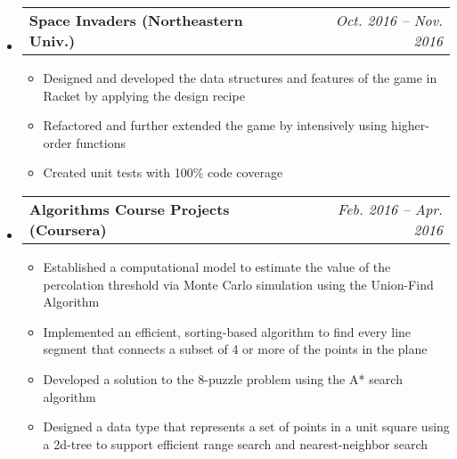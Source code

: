 \documentclass[letterpaper,11pt]{article}
\makeatletter
\newcommand{\resitem}[1]{\item #1 \vspace{-2pt}}
\newcommand{\ressubheadingproj}[4]{
\begin{tabular*}{6.5in}{l@{\extracolsep{\fill}}r}
    \textbf{#1} & \textit{#2} \\
\end{tabular*}\vspace{-6pt}}
\makeatother
\begin{document}
    \begin{itemize}
        \item\ressubheadingproj
        {Space Invaders \normalfont(Northeastern Univ.)}
        {Oct. 2016 -- Nov. 2016}
        {}{}
        {\footnotesize
        \begin{itemize}
            \resitem{Designed and developed the data structures and features of the game in
            Racket by applying the design recipe}
            \resitem{Refactored and further extended the game by intensively using higher-order
            functions}
            \resitem{Created unit tests with 100\% code coverage}

        \end{itemize}
        }
    \end{itemize}

    \begin{itemize}
        \item\ressubheadingproj
        {Algorithms Course Projects \normalfont (Coursera)}{Feb. 2016 -- Apr. 2016}
        {}{}
        {\footnotesize
        \begin{itemize}
            \resitem{Established a computational model to estimate the value of the percolation
            threshold via Monte Carlo simulation using the Union-Find Algorithm}
            \resitem{Implemented an efficient, sorting-based algorithm to find every line segment
            that connects a subset of 4 or more of the points in the plane}
            \resitem{Developed a solution to the 8-puzzle problem using the A* search algorithm}
            \resitem{Designed a data type that represents a set of points in a unit square using
            a 2d-tree to support efficient range search and nearest-neighbor search}
        \end{itemize}
        }
    \end{itemize}

\end{document}
